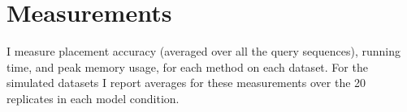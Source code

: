 \section{Measurements}
I measure placement accuracy (averaged over
all the query sequences),  running time,
and peak memory usage, for each method on each dataset.
For the simulated datasets I report averages for these
measurements over the 20 replicates in each model
condition.  




